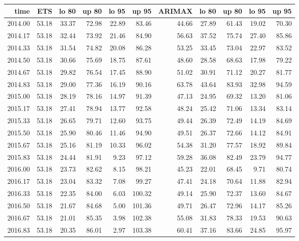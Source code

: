 \documentclass[10pt,a4paper]{article}\usepackage[]{graphicx}\usepackage[]{color}
\begin{document}
\begin{table}[ht]
\centering
\begin{tabular}{rrrrrrrrrrr}
  \hline
time & ETS  & lo 80 & up 80 & lo 95 & up 95 & ARIMAX  & lo 80 & up 80 & lo 95 & up 95 \\ 
  \hline
2014.00 & 53.18 & 33.37 & 72.98 & 22.89 & 83.46 & 44.66 & 27.89 & 61.43 & 19.02 & 70.30 \\ 
  2014.17 & 53.18 & 32.44 & 73.92 & 21.46 & 84.90 & 56.63 & 37.52 & 75.74 & 27.40 & 85.86 \\ 
  2014.33 & 53.18 & 31.54 & 74.82 & 20.08 & 86.28 & 53.25 & 33.45 & 73.04 & 22.97 & 83.52 \\ 
  2014.50 & 53.18 & 30.66 & 75.69 & 18.75 & 87.61 & 48.60 & 28.58 & 68.63 & 17.98 & 79.22 \\ 
  2014.67 & 53.18 & 29.82 & 76.54 & 17.45 & 88.90 & 51.02 & 30.91 & 71.12 & 20.27 & 81.77 \\ 
  2014.83 & 53.18 & 29.00 & 77.36 & 16.19 & 90.16 & 63.78 & 43.64 & 83.93 & 32.98 & 94.59 \\ 
  2015.00 & 53.18 & 28.19 & 78.16 & 14.97 & 91.39 & 47.13 & 24.95 & 69.32 & 13.20 & 81.06 \\ 
  2015.17 & 53.18 & 27.41 & 78.94 & 13.77 & 92.58 & 48.24 & 25.42 & 71.06 & 13.34 & 83.14 \\ 
  2015.33 & 53.18 & 26.65 & 79.71 & 12.60 & 93.75 & 49.44 & 26.39 & 72.49 & 14.19 & 84.69 \\ 
  2015.50 & 53.18 & 25.90 & 80.46 & 11.46 & 94.90 & 49.51 & 26.37 & 72.66 & 14.12 & 84.91 \\ 
  2015.67 & 53.18 & 25.16 & 81.19 & 10.33 & 96.02 & 54.38 & 31.20 & 77.57 & 18.92 & 89.84 \\ 
  2015.83 & 53.18 & 24.44 & 81.91 & 9.23 & 97.12 & 59.28 & 36.08 & 82.49 & 23.79 & 94.77 \\ 
  2016.00 & 53.18 & 23.73 & 82.62 & 8.15 & 98.21 & 45.23 & 22.01 & 68.45 & 9.71 & 80.74 \\ 
  2016.17 & 53.18 & 23.04 & 83.32 & 7.08 & 99.27 & 47.41 & 24.18 & 70.64 & 11.88 & 82.94 \\ 
  2016.33 & 53.18 & 22.35 & 84.00 & 6.03 & 100.32 & 49.14 & 25.90 & 72.37 & 13.60 & 84.67 \\ 
  2016.50 & 53.18 & 21.67 & 84.68 & 5.00 & 101.36 & 49.71 & 26.47 & 72.96 & 14.17 & 85.26 \\ 
  2016.67 & 53.18 & 21.01 & 85.35 & 3.98 & 102.38 & 55.08 & 31.83 & 78.33 & 19.53 & 90.63 \\ 
  2016.83 & 53.18 & 20.35 & 86.01 & 2.97 & 103.38 & 60.41 & 37.16 & 83.66 & 24.85 & 95.97 \\ 

\end{tabular}
\end{table}
\end{document}
